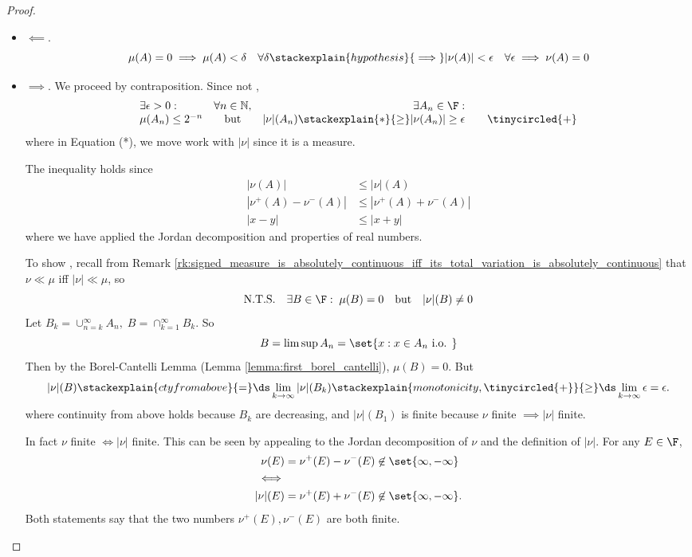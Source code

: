 \documentclass{article} %
\begin{document}
\begin{proof}
\begin{itemize}
\item $\boxed{\impliedby}$. 
\[  \mu(A) = 0 \implies \mu(A) < \delta \quad \forall \delta \stackexplain{hypothesis}{\implies} |\nu(A)| < \epsilon \quad \forall \epsilon \implies \nu(A) = 0\]
\item $\boxed{\implies}$.   We proceed by contraposition. Since not ,
\[
\begin{array}{lcrr}
\exists \epsilon > 0 : & \forall n \in \mathbb{N}, &  \exists A_n \in \F : & \\
\mu(A_n) \leq 2^{-n} & \text{ but } & |\nu|(A_n) \stackexplain{*}{\geq} |\nu(A_n) | \geq \epsilon 
& \quad \tinycircled{+} \end{array}
\]
where in Equation (*), we move work with $|\nu|$ since it is a measure.

{\tiny The inequality holds since  
\begin{align*}
|\nu(A)| &	\leq |\nu|(A) \\
|\nu^+(A) - \nu^-(A)| &\leq |\nu^+(A) + \nu^-(A)| \\
| x -y | &\leq |x + y|
\end{align*}
where we have applied the Jordan decomposition and properties of real numbers.
}

To show , recall from Remark \ref{rk:signed_measure_is_absolutely_continuous_iff_its_total_variation_is_absolutely_continuous} that $\nu \ll \mu$ iff $|\nu| \ll \mu$, so
\[  \text{N.T.S.} \quad  \exists B \in \F : \; \mu(B) = 0 \quad \text{but} \quad |\nu|(B) \neq 0 \]
Let $B_k = \cup_{n=k}^\infty A_n, \; B = \cap_{k=1}^\infty B_k$.  So 
\[  B = \limsup A_n = \set{x : x \in A_n \text{ i.o. }}\]
Then by the Borel-Cantelli Lemma (Lemma \ref{lemma:first_borel_cantelli}), $\mu(B)=0$.  But 
\[ |\nu|(B) \stackexplain{cty from above}{=} \ds\lim_{k \to \infty} |\nu| (B_k) \stackexplain{monotonicity, \tinycircled{+}}{\geq} \ds\lim_{k \to \infty} \epsilon = \epsilon.  \]
where continuity from above holds because $B_k$ are decreasing, and $|\nu|(B_1)$ is finite because $\nu$ finite $\implies |\nu|$ finite.

{\tiny In fact $\nu$ finite $\iff |\nu|$ finite. This  can be seen by appealing to the  Jordan decomposition of $\nu$ and the definition of $|\nu|$.  For any $E \in \F$, 
\begin{align*}
\nu(E) &= \nu^+(E) - \nu^-(E) \not\in \set{\infty, -\infty}\\
\iff &\\
|\nu|(E) &= \nu^+(E) + \nu^-(E) \not\in \set{\infty, -\infty}.
\end{align*}
%
Both statements say that the two numbers $\nu^+(E), \nu^-(E)$ are both finite.}
\end{itemize}	
\end{proof}
\end{document}
